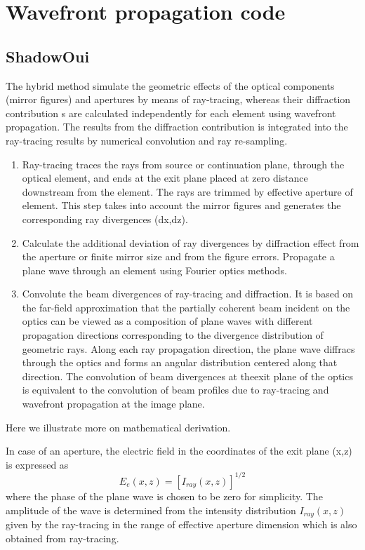 \documentclass[../main.tex]{subfiles}
\begin{document}
	\section{Wavefront propagation code}
	\subsection{ShadowOui}
	The hybrid method simulate the geometric effects of the optical components (mirror figures) and apertures by means of ray-tracing, whereas their diffraction contribution s are calculated independently for each element using wavefront propagation. The results from the diffraction contribution is integrated into the ray-tracing results by numerical convolution and ray re-sampling.
	\begin{enumerate}
	\item Ray-tracing traces the rays from source or continuation plane, through the optical element, and ends at the exit plane placed at zero distance downstream from the element. The rays are trimmed by effective aperture of element. This step takes into account the mirror figures and generates the corresponding ray divergences (dx,dz).
	\item Calculate the additional deviation of ray divergences by diffraction effect from the aperture or finite mirror size and from the figure errors. Propagate a plane wave through an element using Fourier optics methods.
	\item Convolute the beam divergences of ray-tracing and diffraction. It is based on the far-field approximation that the partially coherent beam incident on the optics can be viewed as a composition of plane waves with different propagation directions corresponding to the divergence distribution of geometric rays. Along each ray propagation direction, the plane wave diffracs through the optics and forms an angular distribution centered along that direction. The convolution of beam divergences at theexit plane of the optics is equivalent to the convolution of beam profiles due to ray-tracing and wavefront propagation at the image plane.
	\end{enumerate}
	Here we illustrate more on mathematical derivation.

	In case of an aperture, the electric field in the coordinates of the exit plane (x,z) is expressed as
	\begin{equation}
	E_e(x,z)=[I_{ray}(x,z)]^{1/2}
	\end{equation}
	where the phase of the plane wave is chosen to be zero for simplicity. The amplitude of the wave is determined from the intensity distribution $I_{ray}(x,z)$ given by the ray-tracing in the range of effective aperture dimension which is also obtained from ray-tracing.
\end{document}

